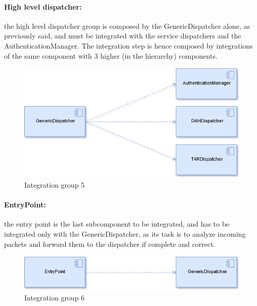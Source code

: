 \newpage
\paragraph{High level dispatcher:} the high level dispatcher group is composed by the GenericDispatcher alone, as previously said, and must be integrated with the service dispatchers and the AuthenticationManager. The integration step is hence composed by integrations of the same component with 3 higher (in the hierarchy) components.
\begin{figure}[H]
    \includegraphics[width=.7\linewidth, keepaspectratio]{./Images/Section5/integration_g5.png}
    \centering
    \caption{Integration group 5}
    \label{fig:intg5}
 \end{figure}

\paragraph{EntryPoint:} the entry point is the last subcomponent to be integrated, and has to be integrated only with the GenericDispatcher, as its task is to analyze incoming packets and forward them to the dispatcher if complete and correct.
\begin{figure}[H]
    \includegraphics[width=.7\linewidth, keepaspectratio]{./Images/Section5/integration_g6.png}
    \centering
    \caption{Integration group 6}
    \label{fig:intg6}
 \end{figure}

\newpage
